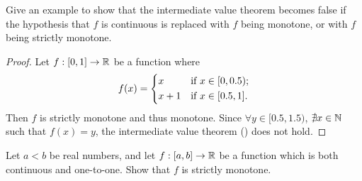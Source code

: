 \begin{ex}\label{i:ex:9.8.2}
  Give an example to show that the intermediate value theorem becomes false if the hypothesis that \(f\) is continuous is replaced with \(f\) being monotone, or with \(f\) being strictly monotone.
\end{ex}

\begin{proof}
  Let \(f : [0, 1] \to \mathbb{R}\) be a function where
  \[
    f(x) = \begin{dcases}
      x     & \text{if } x \in [0, 0.5); \\
      x + 1 & \text{if } x \in [0.5, 1].
    \end{dcases}
  \]
  Then \(f\) is strictly monotone and thus monotone.
  Since \(\forall y \in [0.5, 1.5)\), \(\nexists x \in \mathbb{N}\) such that \(f(x) = y\), the intermediate value theorem () does not hold.
\end{proof}

\begin{ex}\label{i:ex:9.8.3}
  Let \(a < b\) be real numbers, and let \(f : [a, b] \to \mathbb{R}\) be a function which is both continuous and one-to-one.
  Show that \(f\) is strictly monotone.
\end{ex}

